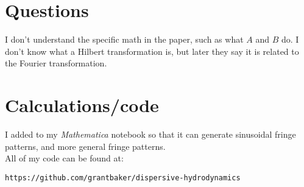 \documentclass[11pt]{article}
\begin{document}
\section*{Questions}

I don't understand the specific math in the paper, such as what $A$ and $B$ do. I don't know what a Hilbert transformation is, but later they say it is related to the Fourier transformation.

\section*{Calculations/code}

I added to my \textit{Mathematica} notebook so that it can generate sinusoidal fringe patterns, and more general fringe patterns.\\

All of my code can be found at:

\texttt{https://github.com/grantbaker/dispersive-hydrodynamics}
\end{document}
